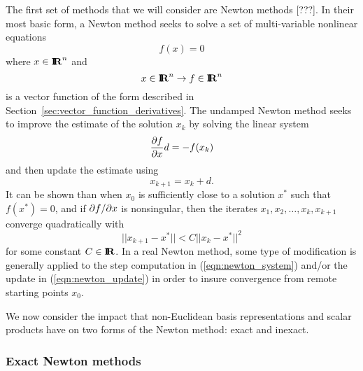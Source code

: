 The first set of methods that we will consider are Newton methods [???].  In
their most basic form, a Newton method seeks to solve a set of multi-variable
nonlinear equations
%
\[
f(x) = 0
\]
%
where $x\in\mbox{\textbf{I}}\hspace{-0.6ex}\mbox{\textbf{R}}^n$ and
%
\[
x\in\mbox{\textbf{I}}\hspace{-0.6ex}\mbox{\textbf{R}}^n \rightarrow f\in\mbox{\textbf{I}}\hspace{-0.6ex}\mbox{\textbf{R}}^n
\]
%
is a vector function of the form described in
Section~\ref{sec:vector_function_derivatives}.  The undamped Newton method
seeks to improve the estimate of the solution $x_k$ by solving the linear
system
%
\begin{equation}
\displaystyle{\frac{\partial f}{\partial x}} d = - f(x_k)
\label{eqn:newton_system}
\end{equation}
%
and then update the estimate using
%
\begin{equation}
x_{k+1} = x_k + d.
\label{eqn:newton_update}
\end{equation}
%
It can be shown than when $x_0$ is sufficiently close to a solution $x^*$ such
that $f(x^*)=0$, and if $\partial f / \partial x$ is nonsingular, then the iterates $x_1,
x_2, {}\ldots, x_k, x_{k+1}$ converge quadratically with
%
\[
||x_{k+1}-x^*|| < C ||x_k-x^*||^2
\]
for some constant $C\in\mbox{\textbf{I}}\hspace{-0.6ex}\mbox{\textbf{R}}$.  In a real Newton method, some type of
modification is generally applied to the step computation in
(\ref{eqn:newton_system}) and/or the update in (\ref{eqn:newton_update}) in
order to insure convergence from remote starting points $x_0$.

We now consider the impact that non-Euclidean basis representations and scalar
products have on two forms of the Newton method: exact and inexact.

\subsubsection*{Exact Newton methods}

